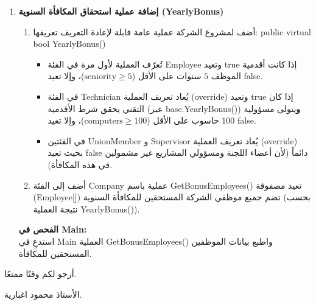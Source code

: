 \documentclass[14pt]{extarticle}
\begin{document}
\begin{enumerate}[label=\textbf{تمرين \arabic*:}, wide=0pt, itemsep=2.2em]
    \item \textbf{إضافة عملية استحقاق المكافأة السنوية (\textenglish{YearlyBonus})}
    \begin{enumerate}[label=\textbf{(\arabic*)}]
        \item أضف لمشروع الشركة عملية عامة قابلة لإعادة التعريف تعريفها: \textenglish{public virtual bool YearlyBonus()}
        \begin{itemize}
            \item تُعرّف العملية لأول مرة في الفئة \textenglish{Employee} وتعيد \textenglish{true} إذا كانت أقدمية الموظف $5$ سنوات على الأقل ($\text{seniority} \ge 5$)، وإلا تعيد \textenglish{false}.
            \item في الفئة \textenglish{Technician} يُعاد تعريف العملية (\textenglish{override}) وتعيد \textenglish{true} إذا كان التقني يحقق شرط الأقدمية (عبر \textenglish{base.YearlyBonus()}) \textbf{و}يتولى مسؤولية $100$ حاسوب على الأقل ($\text{computers} \ge 100$)، وإلا تعيد \textenglish{false}.
            \item في الفئتين \textenglish{UnionMember} و \textenglish{Supervisor} يُعاد تعريف العملية (\textenglish{override}) بحيث تعيد \textenglish{false} دائماً (لأن أعضاء اللجنة ومسؤولي المشاريع غير مشمولين في هذه المكافأة).
        \end{itemize}
        \item أضف إلى الفئة \textenglish{Company} عملية باسم \textenglish{GetBonusEmployees()} تعيد مصفوفة (\textenglish{Employee[]}) تضم جميع موظفي الشركة المستحقين للمكافأة السنوية (بحسب نتيجة العملية \textenglish{YearlyBonus()}).
    \end{enumerate}
    \textbf{الفحص في \textenglish{Main}:} \\
    استدعِ في \textenglish{Main} العملية \textenglish{GetBonusEmployees()} واطبع بيانات الموظفين المستحقين للمكافأة.
    \filbreak

\end{enumerate}

\vspace{1cm}
\begin{flushleft}
أرجو لكم وقتًا ممتعًا.

الأستاذ محمود اغبارية.
\end{flushleft}
\end{document}
